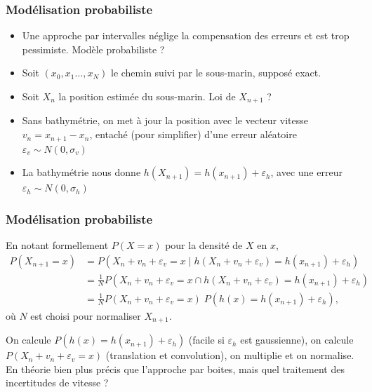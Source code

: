 \documentclass[11pt]{beamer}
\begin{document}
\begin{frame}
  \frametitle{Modélisation probabiliste}
  \begin{itemize}
  \item Une approche par intervalles néglige la compensation des erreurs
    et est trop pessimiste. Modèle probabiliste ?
  \item Soit $(x_{0}, x_{1} \dots, x_{N})$ le chemin suivi par le
    sous-marin, supposé exact.
  \item Soit $X_{n}$ la position estimée du sous-marin. Loi de
    $X_{n+1}$ ?
  \item Sans bathymétrie, on met à jour la position avec le vecteur
    vitesse $v_{n} = x_{n+1} - x_{n}$, entaché (pour simplifier) d'une erreur aléatoire
    $\varepsilon_{v} \sim N(0, \sigma_{v})$
  \item La bathymétrie nous donne $h(X_{n+1}) = h(x_{n+1}) +
    \varepsilon_{h}$, avec une erreur $\varepsilon_{h} \sim N(0, \sigma_{h})$
  \end{itemize}

  \begin{center}
  \end{center}
\end{frame}
\begin{frame}
  \frametitle{Modélisation probabiliste}
  \begin{center}
  \end{center}

  En notant formellement $P(X=x)$ pour la densité de $X$ en $x$,
  \begin{align*}
    P(X_{n+1} = x) &= P(X_{n} + v_{n} + \varepsilon_{v} = x \;\Big|\;
    h(X_{n} + v_{n} + \varepsilon_{v}) = h(x_{n+1}) + 
                     \varepsilon_{h})\\
    &= \frac 1 N P(X_{n} + v_{n} + \varepsilon_{v} = x \cap
    h(X_{n} + v_{n} + \varepsilon_{v}) = h(x_{n+1}) + \varepsilon_{h})\\
    &= \frac 1 N P(X_{n} + v_{n} + \varepsilon_{v} = x) \; P(h(x) = h(x_{n+1}) + \varepsilon_{h}),
  \end{align*}
  où $N$ est choisi pour normaliser $X_{n+1}$.

  On calcule $P(h(x) = h(x_{n+1}) + \varepsilon_{h})$ (facile si
  $\varepsilon_{h}$ est gaussienne), on calcule $P(X_{n} + v_{n} +
  \varepsilon_{v} = x)$ (translation et convolution), on multiplie et on
  normalise. En théorie bien plus précis que l'approche par boites,
  mais quel traitement des incertitudes de vitesse ?
\end{frame}
\end{document}
